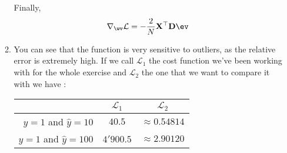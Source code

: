 \documentclass{./../../tex_import/ETHuebung_english}
\begin{document}
\begin{enumerate}
\begin{enumerate}
				Finally,
				\begin{equation}
					\nabla_{\wv}\mathcal{L} = -\frac{2}{N}\mathbf{X}^\top \mathbf{D} \ev				
				\end{equation}
				
			\item You can see that the function is very sensitive to outliers, as the relative error is extremely high. If we call $\mathcal{L}_1$ the cost function we've been working with for the whole exercise and $\mathcal{L}_2$ the one that we want to compare it with we have :
			
				\begin{center}
					\begin{tabular}{r|cc}
					          & $\mathcal{L}_1$ & $\mathcal{L}_2$ 	\\
						\hline
						$y=1$ and $\hat{y}=10$  &   $40.5$ &  $\approx 0.54814	$\\
						$y=1$ and $\hat{y}=100$ &   $4'900.5$ & $\approx 2.90120$\\
					\end{tabular}
				\end{center}
				
		\end{enumerate}
	
	
\end{enumerate}
\end{document}
